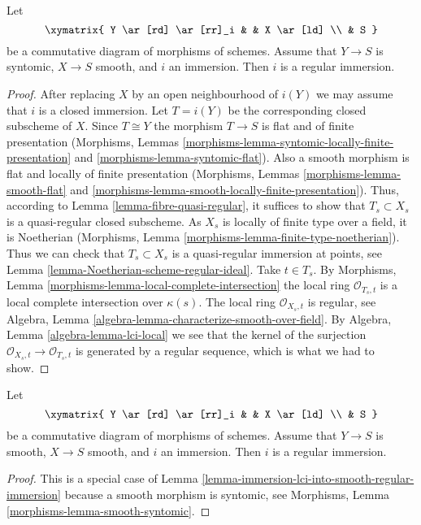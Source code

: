 \begin{lemma}
\label{lemma-immersion-lci-into-smooth-regular-immersion}
Let
$$
\xymatrix{
Y \ar[rd] \ar[rr]_i & & X \ar[ld] \\
& S
}
$$
be a commutative diagram of morphisms of schemes.
Assume that $Y \to S$ is syntomic, $X \to S$ smooth, and
$i$ an immersion. Then $i$ is a regular immersion.
\end{lemma}

\begin{proof}
After replacing $X$ by an open neighbourhood of $i(Y)$
we may assume that $i$ is a closed immersion.
Let $T = i(Y)$ be the corresponding closed subscheme of $X$. Since
$T \cong Y$ the morphism $T \to S$ is flat and of finite presentation
(Morphisms, Lemmas
\ref{morphisms-lemma-syntomic-locally-finite-presentation} and
\ref{morphisms-lemma-syntomic-flat}).
Also a smooth morphism is flat and locally of finite presentation
(Morphisms, Lemmas
\ref{morphisms-lemma-smooth-flat} and
\ref{morphisms-lemma-smooth-locally-finite-presentation}).
Thus, according to
Lemma \ref{lemma-fibre-quasi-regular},
it suffices to show that $T_s \subset X_s$ is a quasi-regular closed
subscheme. As $X_s$ is locally of finite type over a field, it is Noetherian
(Morphisms, Lemma \ref{morphisms-lemma-finite-type-noetherian}).
Thus we can check that $T_s \subset X_s$ is a quasi-regular immersion
at points, see
Lemma \ref{lemma-Noetherian-scheme-regular-ideal}.
Take $t \in T_s$. By
Morphisms, Lemma \ref{morphisms-lemma-local-complete-intersection}
the local ring $\mathcal{O}_{T_s, t}$ is a local complete intersection
over $\kappa(s)$.
The local ring $\mathcal{O}_{X_s, t}$ is regular, see
Algebra, Lemma \ref{algebra-lemma-characterize-smooth-over-field}.
By
Algebra, Lemma \ref{algebra-lemma-lci-local}
we see that the kernel of the surjection
$\mathcal{O}_{X_s, t} \to \mathcal{O}_{T_s, t}$ is generated by a regular
sequence, which is what we had to show.
\end{proof}

\begin{lemma}
\label{lemma-immersion-smooth-into-smooth-regular-immersion}
Let
$$
\xymatrix{
Y \ar[rd] \ar[rr]_i & & X \ar[ld] \\
& S
}
$$
be a commutative diagram of morphisms of schemes.
Assume that $Y \to S$ is smooth, $X \to S$ smooth, and
$i$ an immersion. Then $i$ is a regular immersion.
\end{lemma}

\begin{proof}
This is a special case of
Lemma \ref{lemma-immersion-lci-into-smooth-regular-immersion}
because a smooth morphism is syntomic, see
Morphisms, Lemma \ref{morphisms-lemma-smooth-syntomic}.
\end{proof}

